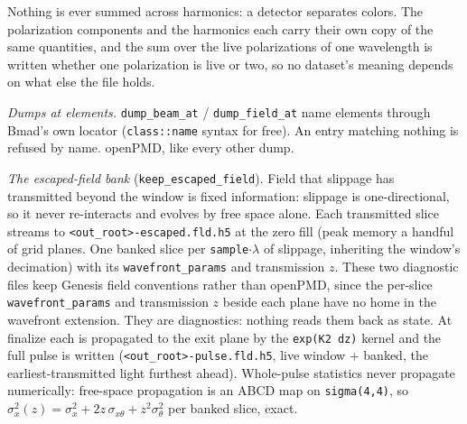 \documentclass[11pt]{article}
\newcommand{\code}[1]{\texttt{#1}}
\begin{document}
Nothing is ever summed across harmonics: a detector separates colors. The polarization
components and the harmonics each carry their own copy of the same quantities, and the
sum over the live polarizations of one wavelength is written whether one polarization
is live or two, so no dataset's meaning depends on what else the file holds.

\emph{Dumps at elements.} \code{dump\_beam\_at} / \code{dump\_field\_at} name
elements through Bmad's own locator (\code{class::name} syntax for free). An entry
matching nothing is refused by name. openPMD, like every other dump.

\emph{The escaped-field bank} (\code{keep\_escaped\_field}). Field that slippage has
transmitted beyond the window is fixed information: slippage is one-directional, so it
never re-interacts and evolves by free space alone. Each transmitted slice streams to
\code{<out\_root>-escaped.fld.h5} at the zero fill (peak memory a handful of grid
planes. One banked slice per \code{sample}$\cdot\lambda$ of slippage, inheriting the
window's decimation) with its \code{wavefront\_params} and transmission $z$. These two
diagnostic files keep Genesis field conventions rather than openPMD, since the
per-slice \code{wavefront\_params} and transmission $z$ beside each plane have no home
in the wavefront extension. They are diagnostics: nothing reads them back as state. At
finalize each is propagated to the exit plane by the \code{exp(K2\,dz)} kernel and
the full pulse is written (\code{<out\_root>-pulse.fld.h5}, live window + banked, the
earliest-transmitted light furthest ahead). Whole-pulse statistics never propagate
numerically: free-space propagation is an ABCD map on \code{sigma(4,4)}, so
$\sigma_x^2(z) = \sigma_x^2 + 2z\,\sigma_{x\theta} + z^2\sigma_\theta^2$ per
banked slice, exact.
\end{document}
